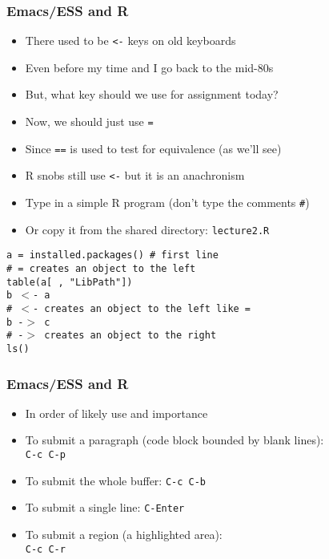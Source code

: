 \documentclass[11pt,pdftex,dvipsnames,usenames,helvetica]{beamer}
\begin{document}
\begin{frame}
\frametitle{Emacs/ESS and R}
\begin{itemize}
\item There used to be {\tt <-} keys on old keyboards\\
\item Even before my time and I go back to the mid-80s
\item But, what key should we use for assignment today?
\item Now, we should just use {\tt =}
\item Since {\tt ==} is used to test for equivalence (as we'll see)
\item R snobs still use {\tt <-} but it is an anachronism
\item Type in a simple R program (don't type the comments {\tt \#})
\item Or copy it from the shared directory: {\tt lecture2.R}
\end{itemize}
{\tt a = installed.packages() \# first line} \\
{\tt \# = creates an object to the left} \\
{\tt table(a[ , "LibPath"])} \\
{\tt b $<$- a} \\
{\tt \# $<$- creates an object to the left like =} \\
{\tt b -$>$ c} \\
{\tt \# -$>$ creates an object to the right} \\
{\tt ls()} \\
\end{frame}

\begin{frame}
\frametitle{Emacs/ESS and R}
\begin{itemize}
\item In order of likely use and importance
\item To submit a paragraph (code block bounded by blank lines):\\
 {\tt C-c C-p}
\item To submit the whole buffer: {\tt C-c C-b}
\item To submit a single line: {\tt C-Enter}
\item To submit a region (a highlighted area):\\
 {\tt C-c C-r}
\end{itemize}
\end{frame}
\end{document}
